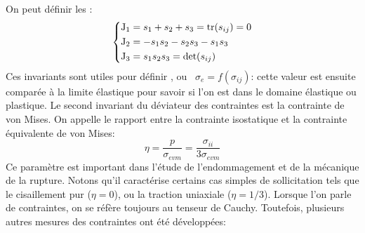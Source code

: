 On peut définir les :
\begin{equation}
\left\{\begin{aligned} 
\mathrm{J}_1 &= s_{1} + s_{2} + s_{3} = \operatorname{tr}(s_{ij}) = 0 \\
\mathrm{J}_2 &= - s_1 s_2 - s_2 s_3 - s_1 s_3 \\
\mathrm{J}_3 &= s_1 s_2 s_3 = \det(s_{ij})
\end{aligned}\right.
\end{equation}
Ces invariants sont utiles pour définir , ou ~$\sigma_e=f(\sigma_{ij})$: cette valeur est ensuite comparée à la limite élastique pour savoir si l'on est dans le domaine élastique ou plastique.
\medskipvm
Le second invariant du déviateur des contraintes est la contrainte de von Mises.
\medskipvm
On appelle  le rapport entre la contrainte isostatique et la contrainte équivalente de von Mises:
\begin{equation} \eta = \frac{p}{\sigma_{e vm}} = \frac{\sigma_{ii}}{3\sigma_{e vm}} \end{equation}
Ce paramètre est important dans l'étude de l'endommagement et de la mécanique de la rupture. Notons qu'il caractérise certains cas simples de sollicitation tels que
le cisaillement pur ($\eta= 0$), ou la traction uniaxiale ($\eta = 1/3$).
\medskipvm
Lorsque l'on parle de contraintes, on se réfère toujours au tenseur de Cauchy. Toutefois, plusieurs autres mesures des contraintes ont été développées:
